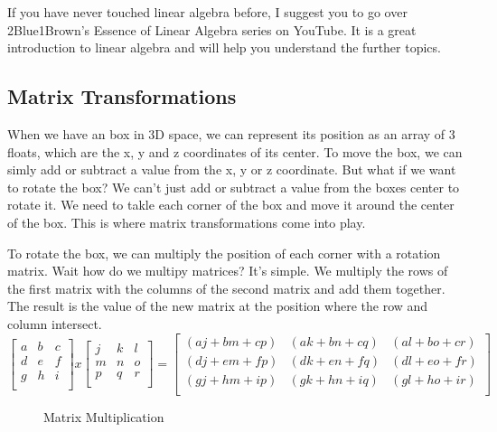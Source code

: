 \documentclass[12pt]{report} \usepackage{preamble}
\begin{document}
If you have never touched linear algebra before, I suggest you to go over
2Blue1Brown's Essence of Linear Algebra series on YouTube. It is a great
introduction to linear algebra and will help you understand the further topics.

\subsection{Matrix Transformations}

When we have an box in 3D space, we can represent its position as an
array of 3 floats, which are the x, y and z coordinates of its center.
To move the box, we can simly add or subtract a value from the x, y or z
coordinate. But what if we want to rotate the box? We can't just add or
subtract a value from the boxes center to rotate it. We need to takle each
corner of the box and move it around the center of the box. This is where
matrix transformations come into play.

To rotate the box, we can multiply the position of each corner with a
rotation matrix. Wait how do we multipy matrices? It's simple. We multiply
the rows of the first matrix with the columns of the second matrix and add them
together. The result is the value of the new matrix at the position where the row and
column intersect.
\[
	\begin{bmatrix}
		a & b & c \\
		d & e & f \\
		g & h & i \\
	\end{bmatrix}
	x
	\begin{bmatrix}
		j & k & l \\
		m & n & o \\
		p & q & r \\
	\end{bmatrix}
	=
	\begin{bmatrix}
		(aj + bm + cp) & (ak + bn + cq) & (al + bo + cr) \\
		(dj + em + fp) & (dk + en + fq) & (dl + eo + fr) \\
		(gj + hm + ip) & (gk + hn + iq) & (gl + ho + ir) \\
	\end{bmatrix}
\]

\begin{figure}[hbtp]
	\centering 
	\caption{Matrix Multiplication \cite{fig:matrix-multiplication}}
\end{figure}
\end{document}
